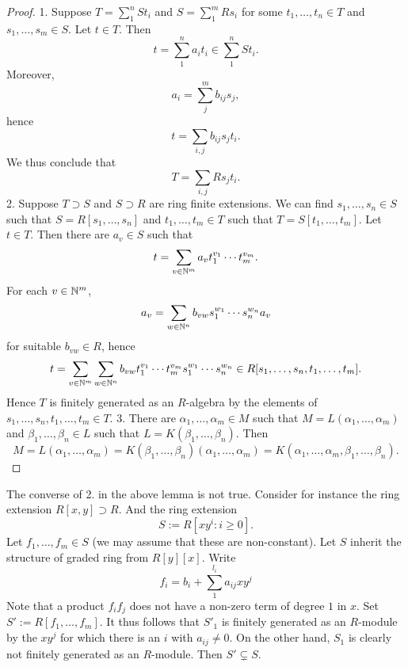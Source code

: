 \begin{proof}
    1. Suppose $T=\sum_1^n St_i$ and $S=\sum_1^m Rs_i$ for some $t_1,\dots, t_n\in T$ and $s_1,\dots,s_m\in S$. Let $t\in T$. Then 
    $$
        t = \sum_1^n a_i t_i \in \sum_1^n S t_i.
    $$
    Moreover, 
    $$
        a_i = \sum_j^m b_{ij}s_j,
    $$
    hence 
    $$
        t = \sum_{i,j} b_{ij}s_jt_i.
    $$
    We thus conclude that 
    $$
        T = \sum_{i,j} R s_jt_i.
    $$
    2. Suppose $T\supset S$ and $S\supset R$ are ring finite extensions. We can find $s_1,\dots,s_n\in S$ such that $S = R[s_1,\dots,s_n]$ and $t_1,\dots,t_m\in T$ such that $T=S[t_1,\dots,t_m]$. Let $t \in T$.  Then there are $a_v\in S$ such that 
    $$t = \sum_{v\in \mathbb{N}^m} a_vt_1^{v_1}\cdots  t_m^{v_m}.$$
    For each $v\in \mathbb{N}^m$, $$a_v = \sum_{w\in \mathbb{N}^n} b_{vw}s_1^{w_1}\cdots s_n^{w_n}a_v $$ for suitable $b_{vw}\in R$, hence 
   $$t=\sum_{v\in \mathbb{N}^m} \sum_{w\in \mathbb{N}^n} b_{vw}t_1^{v_1}\cdots t_m^{v_m}s_1^{w_1}\cdots s_n^{w_n}\in R[s_1,\dots,s_n,t_1,\dots,t_m].$$
    Hence $T$ is finitely generated as an $R$-algebra by the elements of $s_1,\dots,s_n,t_1,\dots,t_m\in T$.
    3. There are $\alpha_1,\dots,\alpha_m\in M$ such that $M=L(\alpha_1,\dots,\alpha_m)$ and $\beta_1,\dots,\beta_n\in L$ such that $L= K(\beta_1,\dots,\beta_n)$. Then 
    $$M=L(\alpha_1,\dots,\alpha_m)=K(\beta_1,\dots,\beta_n)(\alpha_1,\dots,\alpha_m) = K(\alpha_1,\dots,\alpha_m,\beta_1,\dots,\beta_n).$$
\end{proof}
\begin{example}
    The converse of 2. in the above lemma is not true. Consider for instance the ring extension $R[x,y]\supset R$. And the ring extension 
    $$
        S := R[xy^i : i \geq 0].
    $$ 
    Let $f_1,\dots,f_m\in S$ (we may assume that these are non-constant). Let $S$ inherit the structure of graded ring from $R[y][x]$.
    Write 
    $$
        f_i = b_i + \sum_1^{l_i} a_{ij} xy^j
    $$
    Note that a product $f_if_j$ does not have a non-zero term of degree $1$ in $x$. Set $S' := R[f_1,\dots,f_m]$. It thus follows that $S'_1$ is finitely generated as an $R$-module by the $xy^j$ for which there is an $i$ with $a_{ij} \neq 0$. On the other hand, $S_1$ is clearly not finitely generated as an $R$-module. Then $S'\subsetneq S$.  
\end{example}
